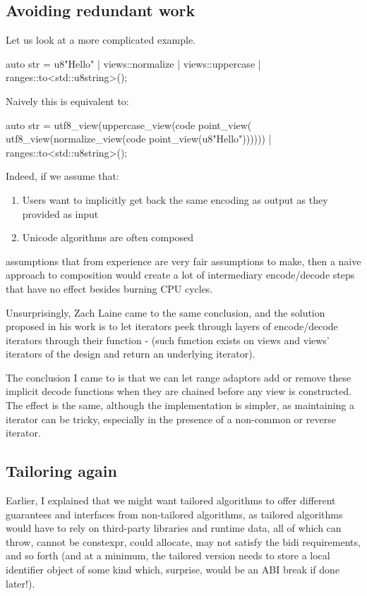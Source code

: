 \documentclass{wg21}
\begin{document}
\subsection{Avoiding redundant work}

Let us look at a more complicated example.

\begin{colorblock}
auto str = u8"Hello" | views::normalize | views::uppercase | ranges::to<std::u8string>();
\end{colorblock}

Naively this is equivalent to:

\begin{colorblock}
auto str = utf8_view(uppercase_view(code point_view(
           utf8_view(normalize_view(code point_view(u8"Hello"))))))
          | ranges::to<std::u8string>();
\end{colorblock}


Indeed, if we assume that:
\begin{enumerate}
\item Users want to implicitly get back the same encoding as output as they provided as input
\item Unicode algorithms are often composed
\end{enumerate}

assumptions that from experience are very fair assumptions to make, then a naive approach to composition would create a lot of intermediary encode/decode steps that have no effect besides burning CPU cycles.

Unsurprisingly, Zach Laine came to the same conclusion, and the solution proposed in his work is to let iterators peek through layers of encode/decode iterators through their  function - (such function exists on views and views' iterators of the  design and return an underlying iterator).

The conclusion I came to is that we can let range adaptors add or remove these implicit decode functions when they are chained before any view is constructed.
The effect is the same, although the implementation is simpler, as maintaining a  iterator can be tricky, especially in the presence of a non-common or reverse iterator.

\subsection{Tailoring again}

Earlier, I explained that we might want tailored algorithms to offer different guarantees and interfaces from non-tailored algorithms,
as tailored algorithms would have to rely on third-party libraries and runtime data, all of which can throw, cannot be constexpr, could allocate, may not satisfy the bidi requirements, and so forth (and at a minimum, the tailored version needs to store a local identifier object of some kind which, surprise, would be an ABI break if done later!).
\end{document}
